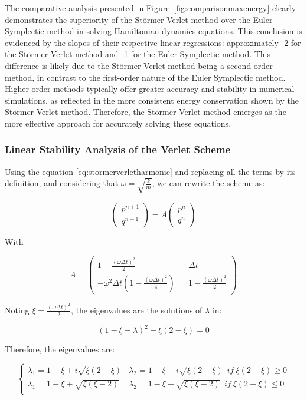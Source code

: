 \documentclass{report}
\begin{document}
The comparative analysis presented in Figure~\ref{fig:comparisonmaxenergy} clearly demonstrates the superiority of the Störmer-Verlet method over the Euler Symplectic method in solving Hamiltonian dynamics equations. This conclusion is evidenced by the slopes of their respective linear regressions: approximately -2 for the Störmer-Verlet method and -1 for the Euler Symplectic method. This difference is likely due to the Störmer-Verlet method being a second-order method, in contrast to the first-order nature of the Euler Symplectic method. Higher-order methods typically offer greater accuracy and stability in numerical simulations, as reflected in the more consistent energy conservation shown by the Störmer-Verlet method. Therefore, the Störmer-Verlet method emerges as the more effective approach for accurately solving these equations.

\subsubsection{Linear Stability Analysis of the Verlet Scheme}
\label{sec:linear_stability_verlet}

Using the equation \ref{eq:stormerverletharmonic} and replacing all the terms by its definition, and considering that \(\omega = \sqrt{\frac{k}{m}}\), we can rewrite the scheme as:

\[
	\begin{pmatrix} p^{n+1} \\ q^{n+1} \end{pmatrix} = A \begin{pmatrix} p^{n} \\ q^{n} \end{pmatrix}
\]

With

\[
	A = \begin{pmatrix}
		1 - \frac{(\omega \Delta t)^2}{2} && \Delta t \\
		-\omega^2 \Delta t (1 - \frac{(\omega \Delta t)^2}{4}) && 1 - \frac{(\omega \Delta t)^2}{2}
	\end{pmatrix}
\]

Noting \(\xi = \frac{(\omega \Delta t)^2}{2}\), the eigenvalues are the solutions of $\lambda$ in:

\[
	(1 - \xi - \lambda)^2 + \xi (2 - \xi) = 0
\]

Therefore, the eigenvalues are:

\[
	\begin{cases}
		\lambda_1 = 1 - \xi + i\sqrt{\xi(2-\xi)} &
		\lambda_2 = 1 - \xi - i\sqrt{\xi(2-\xi)} \ \ if \ \xi(2-\xi) \geq 0 \\

		\lambda_1 = 1 - \xi + \sqrt{\xi(\xi - 2)} &
		\lambda_2 = 1 - \xi - \sqrt{\xi(\xi - 2)} \ \ if \ \xi(2-\xi) \leq 0 \\
	\end{cases}
\]
\end{document}
